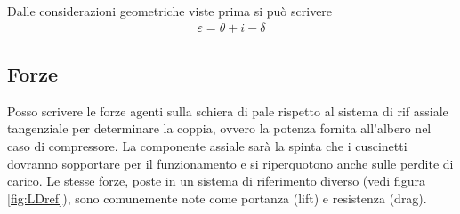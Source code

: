 Dalle considerazioni geometriche viste prima si può scrivere
\begin{align*}
\varepsilon = \theta + i - \delta
\end{align*}

\subsection{Forze}
Posso scrivere le forze agenti sulla schiera di pale rispetto al sistema di rif assiale tangenziale per determinare la coppia, ovvero la potenza fornita all'albero nel caso di compressore. La componente assiale sarà la spinta che i cuscinetti dovranno sopportare per il funzionamento e si riperquotono anche sulle perdite di carico. Le stesse forze, poste in un sistema di riferimento diverso (vedi figura \ref{fig:LDref}), sono comunemente note come portanza (lift) e resistenza (drag).

